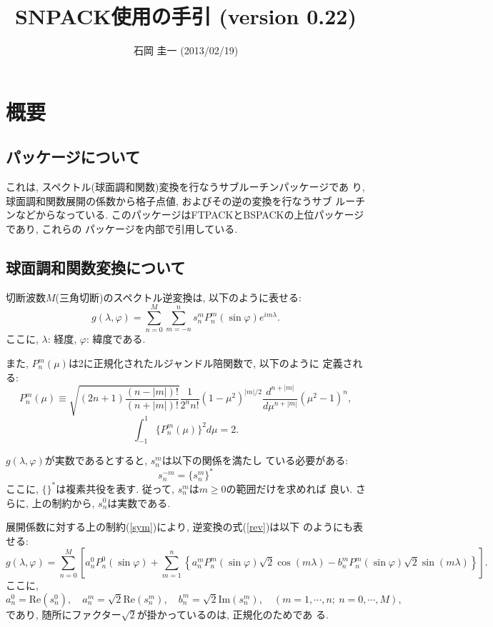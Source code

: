 \documentclass[a4j,fleqn]{jarticle}
\title{SNPACK使用の手引 (version 0.22)}
\author{石岡 圭一  (2013/02/19)}
\date{}
\newcommand{\re}{\mbox{Re}}
\newcommand{\im}{\mbox{Im}}
\begin{document}
\maketitle

\section{概要}

\subsection{パッケージについて}

これは, スペクトル(球面調和関数)変換を行なうサブルーチンパッケージであ
り, 球面調和関数展開の係数から格子点値, およびその逆の変換を行なうサブ
ルーチンなどからなっている. 
このパッケージはFTPACKとBSPACKの上位パッケージであり, これらの
パッケージを内部で引用している. 


\subsection{球面調和関数変換について}

切断波数$M$(三角切断)のスペクトル逆変換は, 以下のように表せる:
\begin{equation}
g(\lambda,\varphi)=\sum^M_{n=0}\sum^n_{m=-n}
s^m_nP^m_n(\sin\varphi)e^{im\lambda}.
\label{rev}
\end{equation}
ここに, $\lambda$: 経度, $\varphi$: 緯度である.

また, $P^m_n(\mu)$は2に正規化されたルジャンドル陪関数で, 以下のように
定義される:
\begin{equation}
P^m_n(\mu)\equiv\sqrt{(2n+1)\frac{(n-|m|)!}{(n+|m|)!}}
\frac1{2^nn!}(1-\mu^2)^{|m|/2}
\frac{d^{n+|m|}}{d\mu^{n+|m|}}(\mu^2-1)^n,
\end{equation}
\begin{equation}
\int^1_{-1}\{P^m_n(\mu)\}^2d\mu=2.
\end{equation}

$g(\lambda,\varphi)$が実数であるとすると, $s^m_n$は以下の関係を満たし
ている必要がある:
\begin{equation}
s^{-m}_n=\{s^m_n\}^{*}
\label{sym}
\end{equation}
ここに, $\{ \}^{*}$は複素共役を表す.
従って, $s^m_n$は$m\ge 0$の範囲だけを求めれば
良い. さらに, 上の制約から, $s^0_n$は実数である.

展開係数に対する上の制約(\ref{sym})により, 逆変換の式(\ref{rev})は以下
のようにも表せる:
\begin{equation}
g(\lambda,\varphi)=\sum^M_{n=0}
\left[
a^0_nP^0_n(\sin\varphi)+
\sum^n_{m=1}
\left\{
a^m_nP^m_n(\sin\varphi)\sqrt{2}\cos(m\lambda)
-b^m_nP^m_n(\sin\varphi)\sqrt{2}\sin(m\lambda)
\right\}
\right].
\end{equation}
ここに,
\begin{equation}
a^0_n=\re(s^0_n),
\quad a^m_n=\sqrt{2} \re(s^m_n), 
\quad b^m_n=\sqrt{2} \im(s^m_n), 
\quad (m=1,\cdots,n;\ n=0,\cdots,M),
\end{equation}
であり, 随所にファクター$\sqrt{2}$が掛かっているのは, 正規化のためであ
る.
\end{document}
